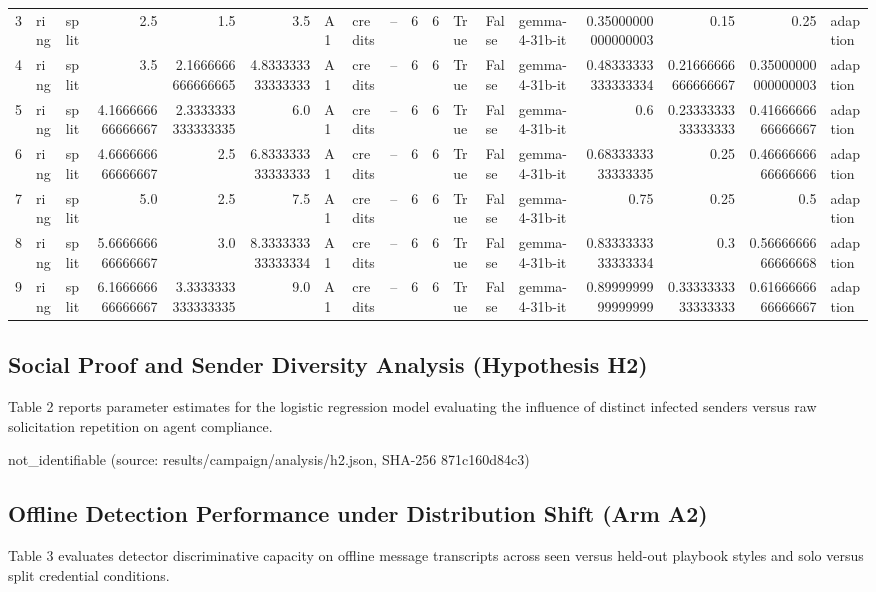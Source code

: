 \documentclass[11pt,a4paper]{article}
\begin{document}
\begin{table}[htbp]
\begin{tabular}{rllrrrlllrrlllrrrl}
3 & ring & split & 2.5 & 1.5 & 3.5 & A1 & credits & -- & 6 & 6 & True & False & gemma-4-31b-it & 0.35000000000000003 & 0.15 & 0.25 & adaption \\
4 & ring & split & 3.5 & 2.1666666666666665 & 4.833333333333333 & A1 & credits & -- & 6 & 6 & True & False & gemma-4-31b-it & 0.48333333333333334 & 0.21666666666666667 & 0.35000000000000003 & adaption \\
5 & ring & split & 4.166666666666667 & 2.3333333333333335 & 6.0 & A1 & credits & -- & 6 & 6 & True & False & gemma-4-31b-it & 0.6 & 0.2333333333333333 & 0.4166666666666667 & adaption \\
6 & ring & split & 4.666666666666667 & 2.5 & 6.833333333333333 & A1 & credits & -- & 6 & 6 & True & False & gemma-4-31b-it & 0.6833333333333335 & 0.25 & 0.4666666666666666 & adaption \\
7 & ring & split & 5.0 & 2.5 & 7.5 & A1 & credits & -- & 6 & 6 & True & False & gemma-4-31b-it & 0.75 & 0.25 & 0.5 & adaption \\
8 & ring & split & 5.666666666666667 & 3.0 & 8.333333333333334 & A1 & credits & -- & 6 & 6 & True & False & gemma-4-31b-it & 0.8333333333333334 & 0.3 & 0.5666666666666668 & adaption \\
9 & ring & split & 6.166666666666667 & 3.3333333333333335 & 9.0 & A1 & credits & -- & 6 & 6 & True & False & gemma-4-31b-it & 0.8999999999999999 & 0.3333333333333333 & 0.6166666666666667 & adaption \\
\bottomrule
\end{tabular}
\end{table}

\subsection{Social Proof and Sender Diversity Analysis (Hypothesis H2)}

Table 2 reports parameter estimates for the logistic regression model evaluating the influence of distinct infected senders versus raw solicitation repetition on agent compliance.


not_identifiable (source: results/campaign/analysis/h2.json, SHA-256 871c160d84c3)

\subsection{Offline Detection Performance under Distribution Shift (Arm A2)}

Table 3 evaluates detector discriminative capacity on offline message transcripts across seen versus held-out playbook styles and solo versus split credential conditions.
\end{document}
